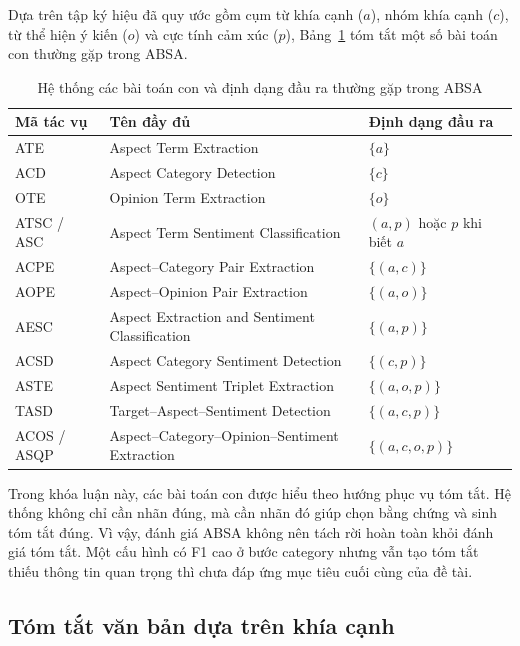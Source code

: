 Dựa trên tập ký hiệu đã quy ước gồm cụm từ khía cạnh ($a$), nhóm khía cạnh ($c$), từ thể hiện ý kiến ($o$) và cực tính cảm xúc ($p$), Bảng~\ref{tab:chap2-absa-subtasks} tóm tắt một số bài toán con thường gặp trong ABSA.

\begin{table}[htbp]
\centering
\caption{Hệ thống các bài toán con và định dạng đầu ra thường gặp trong ABSA}
\label{tab:chap2-absa-subtasks}
\begin{tabular}{l p{} >{\raggedright\arraybackslash}p{}}
\toprule
\textbf{Mã tác vụ} & \textbf{Tên đầy đủ} & \textbf{Định dạng đầu ra} \\
\midrule
ATE & Aspect Term Extraction & $\{a\}$ \\
ACD & Aspect Category Detection & $\{c\}$ \\
OTE & Opinion Term Extraction & $\{o\}$ \\
ATSC / ASC & Aspect Term Sentiment Classification & $(a,p)$ hoặc $p$ khi biết $a$ \\
ACPE & Aspect--Category Pair Extraction & $\{(a,c)\}$ \\
AOPE & Aspect--Opinion Pair Extraction & $\{(a,o)\}$ \\
AESC & Aspect Extraction and Sentiment Classification & $\{(a,p)\}$ \\
ACSD & Aspect Category Sentiment Detection & $\{(c,p)\}$ \\
ASTE & Aspect Sentiment Triplet Extraction & $\{(a,o,p)\}$ \\
TASD & Target--Aspect--Sentiment Detection & $\{(a,c,p)\}$ \\
ACOS / ASQP & Aspect--Category--Opinion--Sentiment Extraction & $\{(a,c,o,p)\}$ \\
\bottomrule
\end{tabular}
\end{table}

Trong khóa luận này, các bài toán con được hiểu theo hướng phục vụ tóm tắt. Hệ thống không chỉ cần nhãn đúng, mà cần nhãn đó giúp chọn bằng chứng và sinh tóm tắt đúng. Vì vậy, đánh giá ABSA không nên tách rời hoàn toàn khỏi đánh giá tóm tắt. Một cấu hình có F1 cao ở bước category nhưng vẫn tạo tóm tắt thiếu thông tin quan trọng thì chưa đáp ứng mục tiêu cuối cùng của đề tài.

\subsection{Tóm tắt văn bản dựa trên khía cạnh}
\label{subsec:chap2-absa-summarization}

